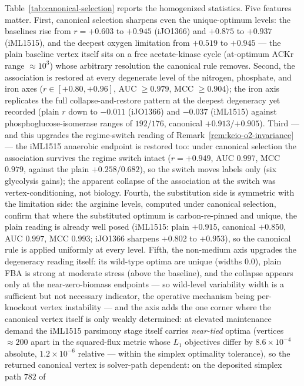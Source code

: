 \documentclass[11pt,a4paper]{article}
\theoremstyle{plain}
\theoremstyle{definition}
\theoremstyle{remark}
\begin{document}
Table~\ref{tab:canonical-selection} reports the homogenized
statistics. Five features matter. First, canonical selection
sharpens even the unique-optimum levels: the baselines rise from
$r=+0.603$ to $+0.945$ (iJO1366) and $+0.875$ to $+0.937$ (iML1515),
and the deepest oxygen limitation from $+0.519$ to $+0.945$ --- the
plain baseline vertex itself sits on a free acetate-kinase cycle
(at-optimum ACKr range $\approx 10^{3}$) whose arbitrary resolution
the canonical rule removes. Second, the association is restored at
every degenerate level of the nitrogen, phosphate, and iron axes
($r\in[+0.80,+0.96]$, AUC $\ge 0.979$, MCC $\ge 0.904$); the
iron axis replicates the full collapse-and-restore pattern at the
deepest degeneracy yet recorded (plain $r$ down to $-0.011$
(iJO1366) and $-0.037$ (iML1515) against
phosphoglucose-isomerase ranges of $192$/$176$, canonical
$+0.913$/$+0.905$). Third ---
and this upgrades the regime-switch reading of
Remark~\ref{rem:keio-o2-invariance} --- the iML1515 anaerobic
endpoint is restored too: under canonical selection the association
survives the regime switch intact ($r=+0.949$, AUC $0.997$, MCC
$0.979$, against the plain $+0.258$/$0.682$), so the switch moves
labels only (six glycolysis gains); the apparent collapse of the
association at the switch was vertex-conditioning, not biology.
Fourth, the substitution side is symmetric with the limitation
side: the arginine levels, computed under canonical selection,
confirm that where the substituted optimum is carbon-re-pinned and
unique, the plain reading is already well posed (iML1515: plain
$+0.915$, canonical $+0.850$, AUC $0.997$, MCC $0.993$; iJO1366
sharpens $+0.802$ to $+0.953$), so the canonical rule is applied
uniformly at every level. Fifth, the non-medium axis upgrades the degeneracy
reading itself: its wild-type optima are unique (widths $0.0$),
plain FBA is strong at moderate stress (above the baseline), and
the collapse appears only at the near-zero-biomass endpoints ---
so wild-level variability width is a sufficient but not necessary
indicator, the operative mechanism being per-knockout vertex
instability --- and the axis adds the one corner where the
canonical vertex itself is only weakly determined: at elevated
maintenance demand the iML1515 parsimony stage itself carries
\emph{near-tied} optima (vertices $\approx200$ apart in the
squared-flux metric whose $L_1$ objectives differ by
$8.6\times10^{-4}$ absolute, $1.2\times10^{-6}$ relative --- within
the simplex optimality tolerance), so the returned canonical vertex
is solver-path dependent: on the deposited simplex path $782$ of
\end{document}
